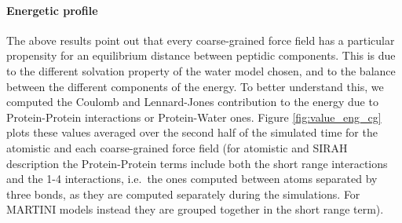 \paragraph{Energetic profile} The above results point out that every coarse-grained force field has a particular propensity for an equilibrium distance between peptidic components. This is due to the different solvation property of the water model chosen, and to the balance between the different components of the energy. To better understand this, we computed the Coulomb and Lennard-Jones contribution to the energy due to Protein-Protein interactions or Protein-Water ones.
%
Figure \ref{fig:value_eng_cg} plots these values averaged over the second half of the simulated time for the atomistic and each coarse-grained force field (for atomistic and SIRAH description the Protein-Protein terms include both the short range interactions and the 1-4 interactions, i.e.\ the ones computed between atoms separated by three bonds, as they are computed separately during the simulations. For MARTINI models instead they are grouped together in the short range term).

